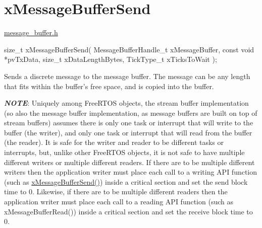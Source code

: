 \hypertarget{group__x_message_buffer_send}{}\section{x\+Message\+Buffer\+Send}
\label{group__x_message_buffer_send}
\hyperlink{message__buffer_8h}{message\+\_\+buffer.\+h}


\begin{DoxyPre}
size\_t xMessageBufferSend( MessageBufferHandle\_t xMessageBuffer,
                           const void *pvTxData,
                           size\_t xDataLengthBytes,
                           TickType\_t xTicksToWait );

\begin{DoxyPre}\end{DoxyPre}
\end{DoxyPre}



\begin{DoxyPre}
\begin{DoxyPre}   Sends a discrete message to the message buffer.  The message can be any
   length that fits within the buffer's free space, and is copied into the
   buffer.\end{DoxyPre}
\end{DoxyPre}



\begin{DoxyPre}
\begin{DoxyPre}   {\itshape {\bfseries NOTE}}:  Uniquely among FreeRTOS objects, the stream buffer
   implementation (so also the message buffer implementation, as message buffers
   are built on top of stream buffers) assumes there is only one task or
   interrupt that will write to the buffer (the writer), and only one task or
   interrupt that will read from the buffer (the reader).  It is safe for the
   writer and reader to be different tasks or interrupts, but, unlike other
   FreeRTOS objects, it is not safe to have multiple different writers or
   multiple different readers.  If there are to be multiple different writers
   then the application writer must place each call to a writing API function
   (such as \hyperlink{message__buffer_8h_a858f6da6fe24a226c45caf1634ea1605}{xMessageBufferSend()}) inside a critical section and set the send
   block time to 0.  Likewise, if there are to be multiple different readers
   then the application writer must place each call to a reading API function
   (such as xMessageBufferRead()) inside a critical section and set the receive
   block time to 0.\end{DoxyPre}
\end{DoxyPre}




